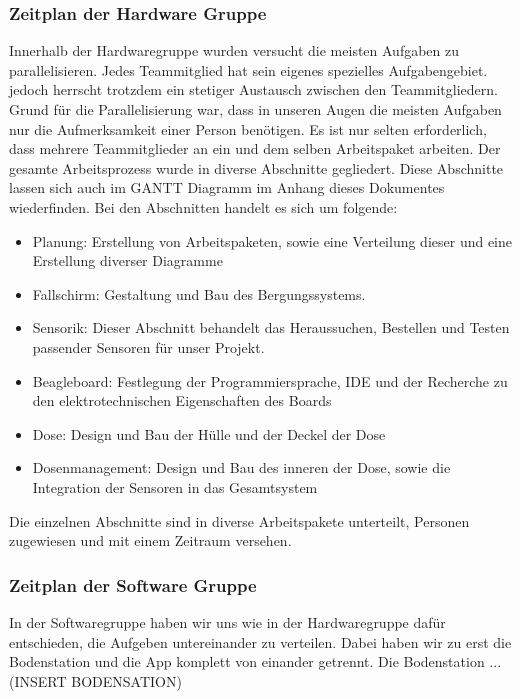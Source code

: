\subsubsection{Zeitplan der Hardware Gruppe}
Innerhalb der Hardwaregruppe wurden versucht die meisten Aufgaben zu parallelisieren. Jedes Teammitglied hat sein eigenes spezielles Aufgabengebiet. jedoch herrscht trotzdem ein stetiger Austausch zwischen den Teammitgliedern. Grund für die Parallelisierung war, dass in unseren Augen die meisten Aufgaben  nur die Aufmerksamkeit einer Person benötigen. Es ist nur selten erforderlich, dass mehrere Teammitglieder an ein und dem selben Arbeitspaket arbeiten. Der gesamte Arbeitsprozess wurde in diverse Abschnitte gegliedert. Diese Abschnitte lassen sich auch im GANTT Diagramm im Anhang dieses Dokumentes wiederfinden. Bei den Abschnitten handelt es sich um folgende:
\begin{itemize}
\item Planung: Erstellung von Arbeitspaketen, sowie eine Verteilung dieser und eine Erstellung diverser Diagramme
\item Fallschirm: Gestaltung und Bau des Bergungssystems.
\item Sensorik: Dieser Abschnitt behandelt das Heraussuchen, Bestellen und Testen passender Sensoren für unser Projekt.
\item Beagleboard: Festlegung der Programmiersprache, IDE und der Recherche zu den elektrotechnischen Eigenschaften des Boards
\item Dose: Design und Bau der Hülle und der Deckel der Dose
\item Dosenmanagement: Design und Bau des inneren der Dose, sowie die Integration der Sensoren in das Gesamtsystem
\end{itemize}

Die einzelnen Abschnitte sind in diverse Arbeitspakete unterteilt, Personen zugewiesen und mit einem Zeitraum versehen.

\subsubsection{Zeitplan der Software Gruppe}
In der Softwaregruppe haben wir uns wie in der Hardwaregruppe dafür entschieden, die Aufgeben untereinander zu verteilen. Dabei haben wir zu erst die Bodenstation und die App komplett von einander getrennt. Die Bodenstation ... (INSERT BODENSATION)

